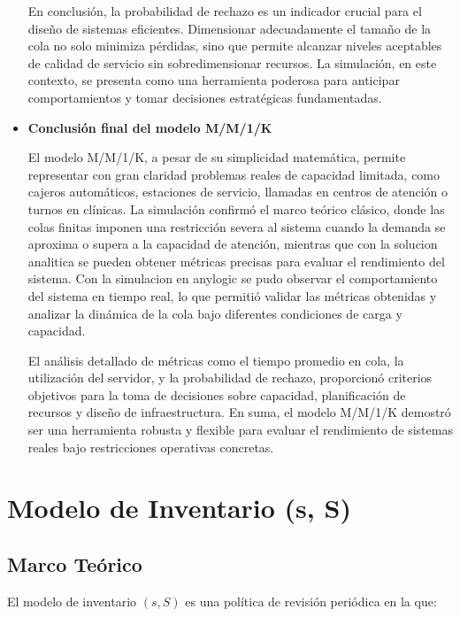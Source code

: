 \documentclass[12pt]{article}
\begin{document}
\begin{itemize}
    En conclusión, la probabilidad de rechazo es un indicador crucial para el diseño de sistemas eficientes. Dimensionar adecuadamente el tamaño de la cola no solo minimiza pérdidas, sino que permite alcanzar niveles aceptables de calidad de servicio sin sobredimensionar recursos. La simulación, en este contexto, se presenta como una herramienta poderosa para anticipar comportamientos y tomar decisiones estratégicas fundamentadas.
    \item \textbf{Conclusión final del modelo M/M/1/K}\par
    El modelo M/M/1/K, a pesar de su simplicidad matemática, permite representar con gran claridad problemas reales de capacidad limitada, como cajeros automáticos, estaciones de servicio, llamadas en centros de atención o turnos en clínicas. La simulación confirmó el marco teórico clásico, donde las colas finitas imponen una restricción severa al sistema cuando la demanda se aproxima o supera a la capacidad de atención, mientras que con la solucion analitica se pueden obtener métricas precisas para evaluar el rendimiento del sistema. Con la simulacion en anylogic se pudo observar el comportamiento del sistema en tiempo real, lo que permitió validar las métricas obtenidas y analizar la dinámica de la cola bajo diferentes condiciones de carga y capacidad.

    El análisis detallado de métricas como el tiempo promedio en cola, la utilización del servidor, y la probabilidad de rechazo, proporcionó criterios objetivos para la toma de decisiones sobre capacidad, planificación de recursos y diseño de infraestructura. En suma, el modelo M/M/1/K demostró ser una herramienta robusta y flexible para evaluar el rendimiento de sistemas reales bajo restricciones operativas concretas.


\end{itemize}

\section{Modelo de Inventario (s, S)}

\subsection{Marco Teórico}

El modelo de inventario $(s, S)$ es una política de revisión periódica en la que:
\end{document}
